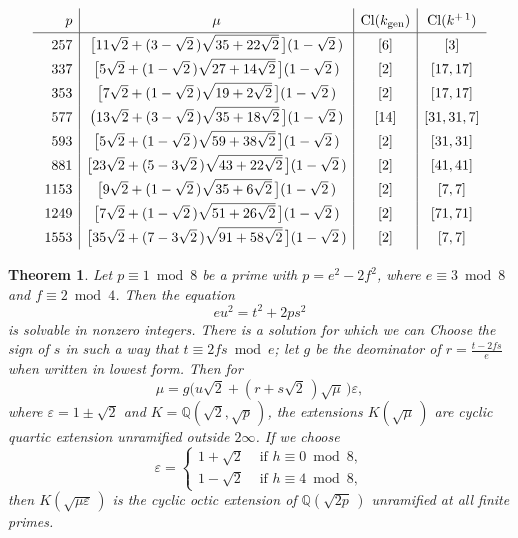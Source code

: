 \documentclass{amsart}
\newcommand{\rsp}{\raisebox{0em}[2.7ex][1.3ex]{\rule{0em}{2ex} }}
\newtheorem{thm}[lem]{Theorem}
\newcommand{\Q}{{\mathbb Q}}
\newcommand{\Cl}{{\operatorname{Cl}}}
\newcommand{\gen}{{\operatorname{gen}}}
\newcommand{\eps}{\varepsilon}
\begin{document}
  
\begin{table}[ht!]
  $$ \begin{array}{r|c|c|c}    
    \rsp  p  & \mu & \Cl(k_\gen) & \Cl(k^{+\,1}) \\ \hline
    \rsp 257 & \big[11\sqrt{2} + (3 - \sqrt{2}\,)\sqrt{35 + 22\sqrt{2}}\,\big]
    (1 - \sqrt{2}\,) & [6] & [3] \\
    \rsp 337 & \big[ 5\sqrt{2} + (1 - \sqrt{2}\,)\sqrt{27 + 14\sqrt{2}}\,\big]
    (1 - \sqrt{2}\,) & [2] & [17,17] \\
   \rsp 353 & \big[ 7\sqrt{2} + (1 - \sqrt{2}\,)\sqrt{19 + 2\sqrt{2}}\, \big]
    (1 - \sqrt{2}\,) & [2] & [17,17] \\
   \rsp 577 &  \big(13\sqrt{2} + (3 - \sqrt{2}\,)\sqrt{35 + 18\sqrt{2}}\,\big]
    (1 - \sqrt{2}\,) & [14] & [31, 31, 7] \\
   \rsp 593 & \big[ 5\sqrt{2} + (1 - \sqrt{2}\,) \sqrt{59 + 38\sqrt{2}}\,\big]
    (1 - \sqrt{2}\,) & [2] & [31, 31] \\
   \rsp 881 & \big[23\sqrt{2} + (5 - 3\sqrt{2}\,) \sqrt{43+22\sqrt{2}}\,\big]
   (1 - \sqrt{2}\,) & [2] &  [41, 41] \\
   \rsp 1153 & \big[9\sqrt{2} + (1  -\sqrt{2}\,) \sqrt{35 + 6\sqrt{2}}\,\big]
   (1 - \sqrt{2}\,) & [2] &  [7, 7] \\
    \rsp 1249 & \big[7\sqrt{2} + (1 - \sqrt{2}\,) \sqrt{51+26\sqrt{2}}\,\big]
    (1 - \sqrt{2}\,) & [2] & [71, 71] \\    
    \rsp 1553 & \big[35\sqrt{2} + (7 -3\sqrt{2}\,) \sqrt{91+58\sqrt{2}}\,\big]
    (1 - \sqrt{2}\,) & [2] & [7, 7]
 \end{array} $$
  \caption{Totally complex unramified octic cyclic extensions}\label{Tab4}
\end{table}



\begin{thm}
  Let $p \equiv 1 \bmod 8$ be a prime with $p = e^2 - 2f^2$, where
  $e \equiv 3 \bmod 8$ and $f \equiv 2 \bmod 4$. Then the equation
  \begin{equation}\label{E2p1}
    eu^2 = t^2 + 2ps^2
  \end{equation}
  is solvable in nonzero integers. There is a solution for which we can
  Choose the sign of $s$ in such a way 
  that $t \equiv 2fs \bmod e$; let $g$ be the deominator of
  $r = \frac{t-2fs}{e}$ when written in lowest form. Then for
  $$ \mu = g\big(u\sqrt{2} + (r+s\sqrt{2}\,) \sqrt{\mu}\,\big)\eps, $$
  where $\eps = 1 \pm \sqrt{2}$ and
  $K = \Q(\sqrt{2},\sqrt{p}\,)$, the extensions $K(\sqrt{\mu}\,)$
  are cyclic quartic extension unramified outside $2 \infty$.
  If we choose
  $$ \eps  = \begin{cases}
    1 + \sqrt{2} & \text{ if } h \equiv 0 \bmod 8, \\
    1 - \sqrt{2} & \text{ if } h \equiv 4 \bmod 8, \end{cases} $$
  then $K(\sqrt{\mu \eps}\,)$ is the cyclic octic extension of
  $\Q(\sqrt{2p}\,)$ unramified at all finite primes.
\end{thm}
\end{document}
